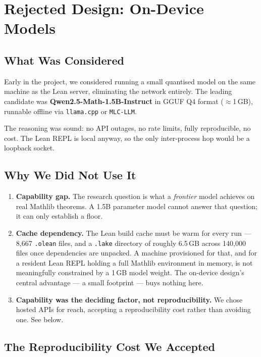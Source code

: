 \chapter{Rejected Design: On-Device Models}
\label{chap:mobile_llms}

\section{What Was Considered}

Early in the project, we considered running a small quantised model on the
same machine as the Lean server, eliminating the network entirely.
The leading candidate was \textbf{Qwen2.5-Math-1.5B-Instruct} in GGUF Q4
format ($\approx$1\,GB), runnable offline via \texttt{llama.cpp} or
\texttt{MLC-LLM}.

The reasoning was sound: no API outages, no rate limits, fully reproducible,
no cost. The Lean REPL is local anyway, so the only inter-process hop would
be a loopback socket.

\section{Why We Did Not Use It}

\begin{enumerate}
  \item \textbf{Capability gap.} The research question is what a
        \emph{frontier} model achieves on real Mathlib theorems.
        A 1.5B parameter model cannot answer that question; it can only
        establish a floor.
  \item \textbf{Cache dependency.} The Lean build cache must be warm for
        every run --- 8{,}667 \texttt{.olean} files, and a \texttt{.lake}
        directory of roughly 6.5\,GB across 140{,}000 files once dependencies
        are unpacked. A machine provisioned for that, and for a resident Lean
        REPL holding a full Mathlib environment in memory, is not meaningfully
        constrained by a 1\,GB model weight. The on-device design's central
        advantage --- a small footprint --- buys nothing here.
  \item \textbf{Capability was the deciding factor, not reproducibility.}
        We chose hosted APIs for reach, accepting a reproducibility cost
        rather than avoiding one. See below.
\end{enumerate}

\section{The Reproducibility Cost We Accepted}

